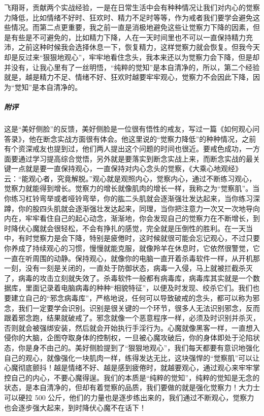 \begin{case}
    飞翔哥，贡献两个实战经验，一是在日常生活中会有种种情况让我们对内心的觉察力降低，比如情绪不好时、狂欢时、精力不足时等等，作为戒者我们要学会避免这些情况。而第二点更重要，我之前一直是消极地避免这些让觉察力下降的因素，但是有些是不可避免的，比如精力下降，人在一天时间里也不可以一直保持精力充沛，之前这种时候我会选择休息一下，恢复精力，这样觉察力就会恢复。但我今天却是反过来“狠狠地观心”，牢牢地看住念头，我本来还以为觉察力会下降，但是却并没有，让我心里有了一丝明悟，“纯粹的觉知”是本自清净的，所以，第二个经验就是，越是精力不足、情绪不好、狂欢时越要牢牢观心，觉察力不会因此下降，因为“觉知”是本自清净的。
    \subparagraph{附评} 这是“美好侧脸”的反馈，美好侧脸是一位很有悟性的戒友，写过一篇《如何观心问答录》，他在断念实战方面很有体会。他这里说的“觉察力降低”的种种情况，之前有个资深戒友也提到过，他们两人提出这个问题的时间也很近。要戒色成功，一方面要通过学习提高综合觉悟，另外就是要落实到断念实战上来，而断念实战的最关键一点就是要一直保持观心，一直保持对内心念头的觉察，《大乘心地观经》云：“能观心者，究竟解脱。”观心就是观照内心，觉察内心，通过不断练习观心，觉察力就能得到增长。觉察力的增长就像肌肉的增长一样，我称之为“觉察肌”。当你练习杠铃弯举或者哑铃弯举，你的肱二头肌就会逐渐强壮发达起来，当你练习深蹲，你的股四头肌就会逐渐强壮发达起来，同理，当你把注意力一次又一次地导向内在，牢牢看住自己的起心动念，渐渐地，你会发现自己的觉察力在不断增长，到时降伏心魔就会很轻松，不会有挣扎的感觉，完全就是压倒性的胜利。在一天当中，有时觉察力是会下降，特别是疲倦时，这时候就很可能会忘记观心，不过只要你养成了持续观心的习惯，慢慢就能克服，就像羚羊在休息时，它依然很警觉，它一直在听周围的动静。保持观心，就像你的电脑一直开着杀毒软件一样，从开机那一刻，没有一刻是关闭的，一直处于防御状态，病毒一入侵，马上就被拦截杀灭了，病毒的攻击立刻就失效了。杀毒软件一般都有病毒库，病毒库其实就是一个数据库，里面记录着电脑病毒的种种“相貌特征”，以便及时发现、绞杀它们。我们也要建立自己的“邪念病毒库”，严格地说，任何可以导致破戒的念头，都可以称为邪念，我们一定要学会识别。识别是很关键的一个环节，很多人无法识别邪念，反而跟着邪念跑，结果就破戒了。邪念就像一个恶意程序一样，必须及时识别并杀灭，否则就会被强绑安装，然后就会开始执行手淫行为。心魔就像黑客一样，一直想入侵你的大脑，企图夺取身体的控制权，一旦被心魔攻破后，你的身体即处于沦陷状态，你是身不由己的。美好侧脸提到了“狠狠地观心”，我们每天都要有意识地强化自己的观心，就像强化一块肌肉一样，练得发达无比，这块强悍的“觉察肌”可以让心魔彻底颤抖！越是情绪不好、越是感到疲倦时，就越要观心，通过观心来牢牢掌控自己的内心，不要心魔得逞。我们的本质是“纯粹的觉知”，纯粹的觉知是无念的状态，是本自清净的，但却有着觉察的品质，我们要做的就是强化觉察力！大力士可以硬拉 500 公斤，他们的力量也是逐步练出来的，我们通过不断观心，觉察力也会逐步强大起来，到时降伏心魔不在话下！
\end{case}

